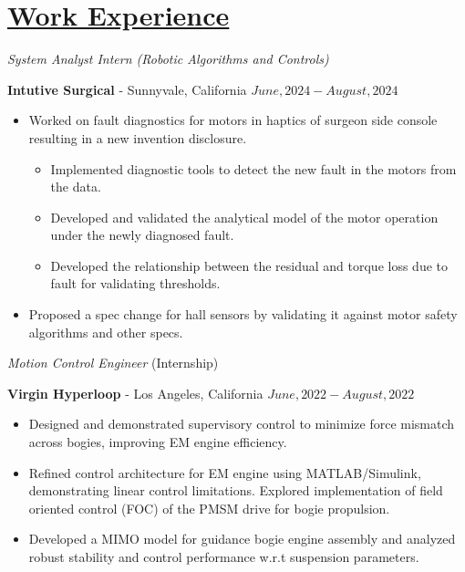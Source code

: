 \section*{\underline{Work Experience}}
\noindent \textit{System Analyst Intern (Robotic Algorithms and Controls)}

\textbf{Intutive Surgical} - Sunnyvale, California \hfill $June, 2024  - August, 2024$

\begin{itemize}
        \item Worked on fault diagnostics for motors in haptics of surgeon side console resulting in a new invention disclosure.
        \begin{itemize}
                \item Implemented diagnostic tools to detect the new fault in the motors from the data.
                \item Developed and validated the analytical model of the motor operation under the newly diagnosed fault.
                \item Developed the relationship between the residual and torque loss due to fault for validating thresholds.
        \end{itemize}
        \item Proposed a spec change for hall sensors by validating it against motor safety algorithms and other specs.
\end{itemize}

\medskip


\noindent \textit{Motion Control Engineer } (Internship)

\textbf{Virgin Hyperloop} - Los Angeles, California \hfill $June, 2022  - August, 2022$

\begin{itemize}
        \item Designed and demonstrated supervisory control to minimize force mismatch across bogies, improving EM engine efficiency.
        \item Refined control architecture for EM engine using MATLAB/Simulink, demonstrating linear control limitations. Explored implementation of field oriented control (FOC) of the PMSM drive for bogie propulsion.
        \item Developed a MIMO model for guidance bogie engine assembly and analyzed robust stability and control performance w.r.t suspension parameters.
\end{itemize}

